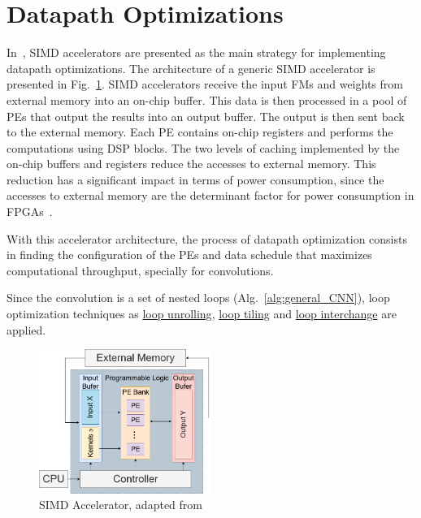 \section{Datapath Optimizations}
\label{sec:Datapath_Optimizations}
In~\cite{hal:accelCNNonFPGA}, SIMD accelerators are presented as the main strategy for implementing datapath optimizations. The architecture of a generic SIMD accelerator is presented in Fig.~\ref{fig:SIMD_accel}. SIMD accelerators receive the input FMs and weights from external memory into an on-chip buffer. This data is then processed in a pool of PEs that output the results into an output buffer. The output is then sent back to the external memory. Each PE contains on-chip registers and performs the computations using DSP blocks.
The two levels of caching implemented by the on-chip buffers and registers reduce the accesses to external memory. This reduction has a significant impact in terms of power consumption, since the accesses to external memory are the determinant factor for power consumption in FPGAs~\cite{sze:dnn_tutorial, hal:accelCNNonFPGA}.


With this accelerator architecture, the process of datapath optimization consists in finding the configuration of the PEs and data schedule that maximizes computational throughput, specially for convolutions.

Since the convolution is a set of nested loops (Alg.~\ref{alg:general_CNN}),
loop optimization techniques as \underline{loop unrolling}, \underline{loop
  tiling} and \underline{loop interchange} are applied.


\begin{figure}[!htb]
	\centering
	\includegraphics[width=0.5\textwidth]{Figures/SIMDAccelerator.png}
	\caption[Caption for figure in TOC.]{SIMD Accelerator, adapted from~\cite{hal:accelCNNonFPGA}}
	\label{fig:SIMD_accel}
\end{figure}

